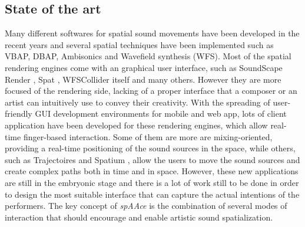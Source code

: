 \documentclass[journal]{IEEEtran}
\begin{document}
\subsection{State of the art}
Many different softwares for spatial sound movements have been developed in the recent years \cite{jot95} \cite{wfsc} \cite{geier12} and several spatial techniques have been implemented such as VBAP, DBAP, Ambisonics and Wavefield synthesis (WFS). 
Most of the spatial rendering engines come with an graphical user interface, such as SoundScape Render \cite{geier12}, Spat \cite{jot95}, WFSCollider \cite{wfsc} itself and many others. However they are more focused of the rendering side, lacking of a proper interface that a composer or an artist can intuitively use to convey their creativity. With the spreading of user-friendly GUI development environments for mobile and web app, lots of client application have been developed for these rendering engines, which allow real-time finger-based interaction. Some of them are more are mixing-oriented, providing a real-time positioning of the sound sources in the space, while others, such as Trajectoires \cite{favory15} and Spatium \cite{penha13}, allow the users to move the sound sources and create complex paths both in time and in space.
However, these new applications are still in the embryonic stage and there is a lot of work still to be done in order to design the most suitable interface that can capture the actual intentions of the performers. The key concept of \emph{spAAce} is the combination of several modes of interaction that should encourage and enable artistic sound spatialization.


\end{document}
